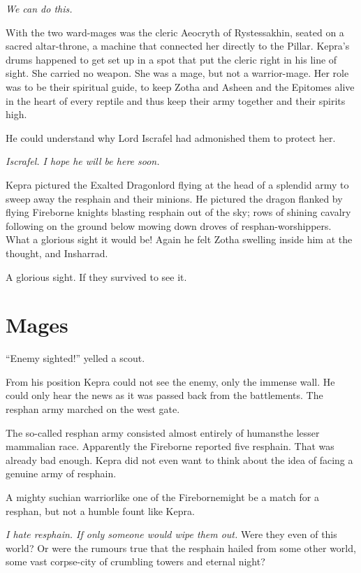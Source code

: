 \documentclass
  [a4paper,
   12pt,
   oneside
  ]%
  {article}
\begin{document}
\emph{We can do this.}

With the two ward-mages was the cleric Aeocryth of Rystessakhin, seated on a sacred altar-throne, a machine that connected her directly to the Pillar. 
Kepra's drums happened to get set up in a spot that put the cleric right in his line of sight. 
She carried no weapon. 
She was a mage, but not a warrior-mage. 
Her role was to be their spiritual guide, to keep Zotha and Asheen and the Epitomes alive in the heart of every reptile and thus keep their army together and their spirits high. 

He could understand why Lord Iscrafel had admonished them to protect her.

\emph{Iscrafel. I hope he will be here soon.} 

Kepra pictured the Exalted Dragonlord flying at the head of a splendid army to sweep away the resphain and their minions. He pictured the dragon flanked by flying Fireborne knights blasting resphain out of the sky; rows of shining cavalry following on the ground below mowing down droves of resphan-worshippers. 
What a glorious sight it would be! Again he felt Zotha swelling inside him at the thought, and Insharrad. 

A glorious sight. If they survived to see it.



\section{Mages}
``Enemy sighted!'' yelled a scout.

From his position Kepra could not see the enemy, only the immense wall. He could only hear the news as it was passed back from the battlements. 
The resphan army marched on the west gate. 

The so-called resphan army consisted almost entirely of humans\dash{}the lesser mammalian race. 
Apparently the Fireborne reported five resphain. That was already bad enough. Kepra did not even want to think about the idea of facing a genuine army of resphain. 

A mighty suchian warrior\dash{}like one of the Fireborne\dash{}might be a match for a resphan, but not a humble fount like Kepra. 

\emph{I hate resphain. If only someone would wipe them out.} Were they even of this world? Or were the rumours true that the resphain hailed from some other world, some vast corpse-city of crumbling towers and eternal night?
\end{document}
